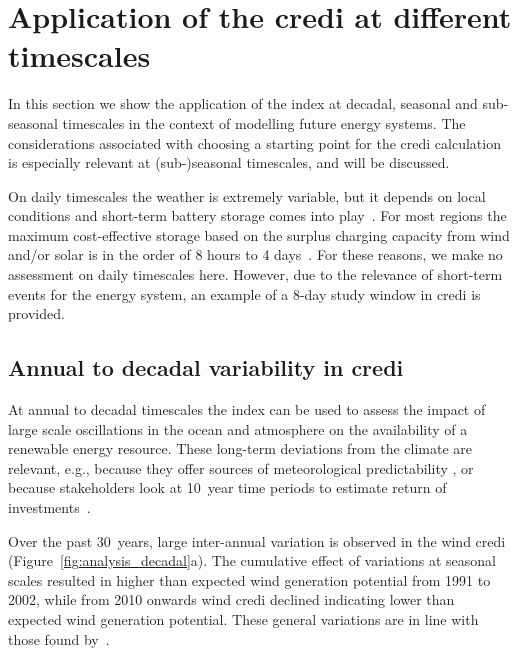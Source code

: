 \documentclass[a4paper,11pt]{extarticle}
\newcommand{\credi}[0]{{\sc credi}}
\newcommand{\wdi}[0]{{\sc wind credi}}
\begin{document}
\section{Application of the \credi{} at different timescales}\label{secCP2:analysis}
In this section we show the application of the index at decadal, seasonal and sub-seasonal timescales in the context of modelling future energy systems. 
The considerations associated with choosing a starting point for the \credi{} calculation is especially relevant at (sub-)seasonal timescales, and will be discussed.

On daily timescales the weather is extremely variable, but it depends on local conditions and short-term battery storage comes into play~\autocite{parzen2023value}. 
For most regions the maximum cost-effective storage based on the surplus charging capacity from wind and/or solar is in the order of 8 hours to 4 days~\parencite{Livingston2020,Sepulveda2021,parzen2023value}. 
For these reasons, we make no assessment on daily timescales here. 
However, due to the relevance of short-term events for the energy system, an example of a 8-day study window in \credi{} is provided.






\subsection{Annual to decadal variability in \credi}\label{sc:decadal}
At annual to decadal timescales the index can be used to assess the impact of large scale oscillations in the ocean and atmosphere on the availability of a renewable energy resource. 
These long-term deviations from the climate are relevant, e.g., because they offer sources of meteorological predictability \parencite{Hawkins2009,Scaife2014}, or because stakeholders look at 10~year time periods to estimate return of investments~\parencite{tennet2023}.

Over the past 30~years, large inter-annual variation is observed in the \wdi{} (Figure~\ref{fig:analysis_decadal}a). 
The cumulative effect of variations at seasonal scales resulted in higher than expected wind generation potential from 1991 to 2002, while from 2010 onwards \wdi{} declined indicating lower than expected wind generation potential. 
These general variations are in line with those found by~\textcite{wohland2019significant,stoop2021detection}. 
\end{document}
